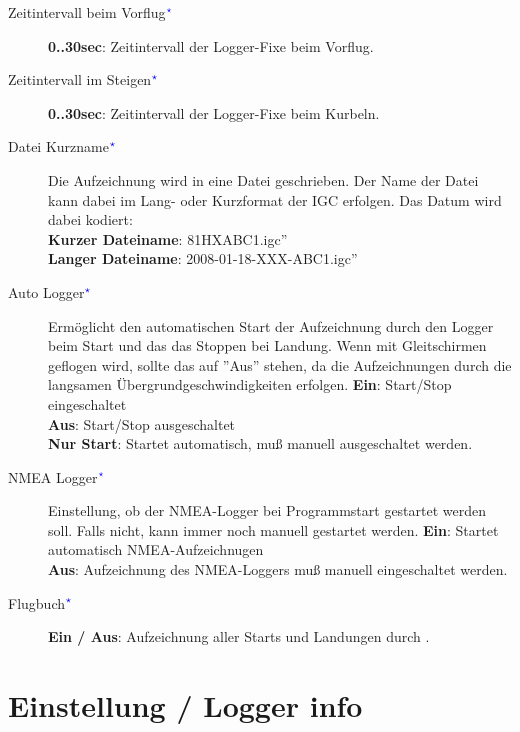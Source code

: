 \begin{description}
\item[Zeitintervall beim Vorflug$^{\textcolor{blue}{\star}}$] {\bf 0..30sec}: Zeitintervall der Logger-Fixe  beim Vorflug.
\item[Zeitintervall im Steigen$^{\textcolor{blue}{\star}}$]  {\bf 0..30sec}: Zeitintervall der Logger-Fixe  beim Kurbeln.
\item[Datei Kurzname$^{\textcolor{blue}{\star}}$] Die Aufzeichnung wird in eine Datei geschrieben. Der Name der Datei kann dabei im Lang- oder Kurzformat der IGC erfolgen. Das Datum wird dabei kodiert:\\
 {\bf Kurzer Dateiname}: \verb''81HXABC1.igc''\\
 {\bf Langer Dateiname}: \verb''2008-01-18-XXX-ABC1.igc''\\
\item[Auto Logger$^{\textcolor{blue}{\star}}$] Ermöglicht den automatischen Start  der Aufzeichnung durch den Logger beim Start und das das Stoppen bei Landung.
Wenn mit Gleitschirmen geflogen wird, sollte das auf ''Aus'' stehen, da  die Aufzeichnungen durch die langsamen Übergrundgeschwindigkeiten erfolgen.
   {\bf Ein}:  Start/Stop eingeschaltet\\
  {\bf Aus}: Start/Stop ausgeschaltet\\
  {\bf Nur Start}: Startet automatisch, muß manuell ausgeschaltet werden.
\item[NMEA Logger$^{\textcolor{blue}{\star}}$] Einstellung, ob der NMEA-Logger bei Programmstart gestartet werden soll. Falls nicht,
kann immer noch manuell gestartet werden.
  {\bf Ein}:  Startet automatisch NMEA-Aufzeichnugen\\
  {\bf Aus}: Aufzeichnung des NMEA-Loggers muß manuell eingeschaltet werden.\\
\item[Flugbuch$^{\textcolor{blue}{\star}}$]  {\bf Ein / Aus}: Aufzeichnung aller Starts und Landungen durch \xc.
\end{description}


\section{Einstellung / Logger info} \label{conf:logger_info}

